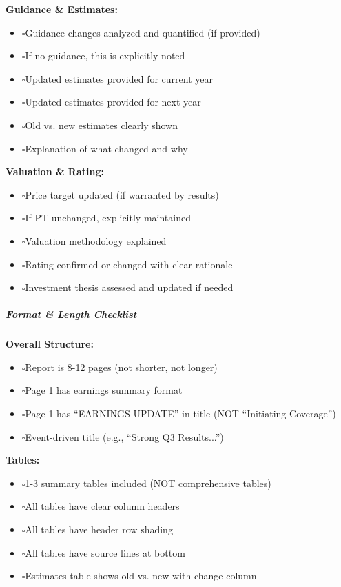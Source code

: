 \documentclass[11pt]{article}
\newcommand{\UncheckedBox}{$\square$}
\begin{document}
\textbf{Guidance \& Estimates:}

\begin{itemize}[leftmargin=*,itemsep=2pt,topsep=2pt]
\item {} \UncheckedBox Guidance changes analyzed and quantified (if provided)
\item {} \UncheckedBox If no guidance, this is explicitly noted
\item {} \UncheckedBox Updated estimates provided for current year
\item {} \UncheckedBox Updated estimates provided for next year
\item {} \UncheckedBox Old vs. new estimates clearly shown
\item {} \UncheckedBox Explanation of what changed and why
\end{itemize}

\textbf{Valuation \& Rating:}

\begin{itemize}[leftmargin=*,itemsep=2pt,topsep=2pt]
\item {} \UncheckedBox Price target updated (if warranted by results)
\item {} \UncheckedBox If PT unchanged, explicitly maintained
\item {} \UncheckedBox Valuation methodology explained
\item {} \UncheckedBox Rating confirmed or changed with clear rationale
\item {} \UncheckedBox Investment thesis assessed and updated if needed
\end{itemize}

\subparagraph{Format \& Length Checklist}\mbox{}\par

\textbf{Overall Structure:}

\begin{itemize}[leftmargin=*,itemsep=2pt,topsep=2pt]
\item {} \UncheckedBox Report is 8-12 pages (not shorter, not longer)
\item {} \UncheckedBox Page 1 has earnings summary format
\item {} \UncheckedBox Page 1 has ``EARNINGS UPDATE'' in title (NOT ``Initiating Coverage'')
\item {} \UncheckedBox Event-driven title (e.g., ``Strong Q3 Results...'')
\end{itemize}

\textbf{Tables:}

\begin{itemize}[leftmargin=*,itemsep=2pt,topsep=2pt]
\item {} \UncheckedBox 1-3 summary tables included (NOT comprehensive tables)
\item {} \UncheckedBox All tables have clear column headers
\item {} \UncheckedBox All tables have header row shading
\item {} \UncheckedBox All tables have source lines at bottom
\item {} \UncheckedBox Estimates table shows old vs. new with change column
\end{itemize}
\end{document}
